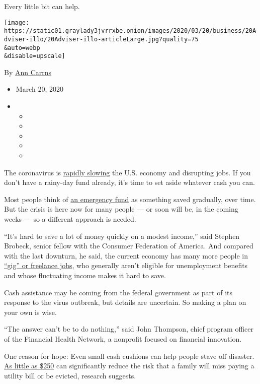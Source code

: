 Every little bit can help.

\texttt{[image: https://static01.graylady3jvrrxbe.onion/images/2020/03/20/business/20Adviser-illo/20Adviser-illo-articleLarge.jpg?quality=75\\\&auto=webp\\\&disable=upscale]}

By \href{https://www.nytimes3xbfgragh.onion/by/ann-carrns}{Ann Carrns}

\begin{itemize}
\item
  March 20, 2020
\item
  \begin{itemize}
  \item
  \item
  \item
  \item
  \item
  \end{itemize}
\end{itemize}

The coronavirus is
\href{https://www.nytimes3xbfgragh.onion/2020/03/16/business/economy/coronavirus-us-economy-shutdown.html}{rapidly
slowing} the U.S. economy and disrupting jobs. If you don't have a
rainy-day fund already, it's time to set aside whatever cash you can.

Most people think of
\href{https://www.nytimes3xbfgragh.onion/2019/10/25/your-money/emergency-savings.html}{an
emergency fund} as something saved gradually, over time. But the crisis
is here now for many people --- or soon will be, in the coming weeks ---
so a different approach is needed.

``It's hard to save a lot of money quickly on a modest income,'' said
Stephen Brobeck, senior fellow with the Consumer Federation of America.
And compared with the last downturn, he said, the current economy has
many more people in
\href{https://www.nytimes3xbfgragh.onion/2020/03/18/technology/gig-economy-pandemic.html}{``gig''
or freelance jobs}, who generally aren't eligible for unemployment
benefits and whose fluctuating income makes it hard to save.

Cash assistance may be coming from the federal government as part of its
response to the virus outbreak, but details are uncertain. So making a
plan on your own is wise.

``The answer can't be to do nothing,'' said John Thompson, chief program
officer of the Financial Health Network, a nonprofit focused on
financial innovation.

One reason for hope: Even small cash cushions can help people stave off
disaster.
\href{https://www.urban.org/research/publication/thriving-residents-thriving-cities-family-financial-security-matters-cities}{As
little as \$250} can significantly reduce the risk that a family will
miss paying a utility bill or be evicted, research suggests.

